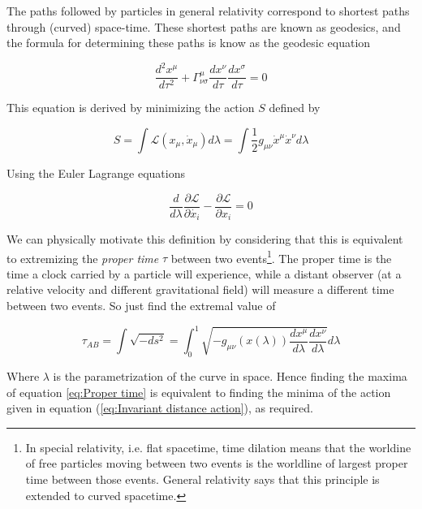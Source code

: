 \documentclass{article}
\begin{document}
The paths followed by particles in general relativity correspond to shortest paths through (curved) space-time. These shortest paths are known as geodesics, and the formula for determining these paths is know as the geodesic equation

\begin{equation}
    \frac{d^2x^{\mu}}{d\tau^2} + \Gamma^{\mu}_{\nu \sigma} \frac{dx^{\nu}}{d\tau} \frac{dx^{\sigma}}{d\tau} = 0
\label{eq:Geodesic equation}
\end{equation}

This equation is derived by minimizing the action $S$ defined by

\newcommand{\Lagr}{\mathcal{L}}

\begin{equation}
    S = \int \mathcal{L}(x_\mu,\dot{x}_\mu) d\lambda = \int \frac{1}{2} g_{\mu \nu} \dot{x}^\mu \dot{x}^\nu d\lambda 
\label{eq:Invariant distance action}
\end{equation}

Using the Euler Lagrange equations

\begin{equation}
    \frac{d}{d\lambda} \frac{\partial \mathcal{L}}{\partial \dot{x_i}} - \frac{\partial \mathcal{L}}{\partial x_i} = 0
\label{eq:Euler-Lagrange equation}
\end{equation}

We can physically motivate this definition by considering that this is equivalent to extremizing the \textit{proper time} $\tau$ between two events\footnote{In special relativity, i.e. flat spacetime, time dilation means that the worldine of free particles moving between two events is the worldline of largest proper time between those events. General relativity says that this principle is extended to curved spacetime.}. The proper time is the time a clock carried by a particle will experience, while a distant observer (at a relative velocity and different gravitational field) will measure a different time between two events. So just find the extremal value of

\begin{equation}
    \tau_{AB} = \int \sqrt{- ds^2} = \int_0^1 \sqrt{-g_{\mu \nu}(x(\lambda))
    \frac{dx^\mu}{d\lambda} \frac{dx^\nu}{d\lambda}}d\lambda 
\label{eq:Proper time}
\end{equation}

Where $\lambda$ is the parametrization of the curve in space. Hence finding the maxima of equation \ref{eq:Proper time} is equivalent to finding the minima of the action given in equation (\ref{eq:Invariant distance action}), as required.
\end{document}
